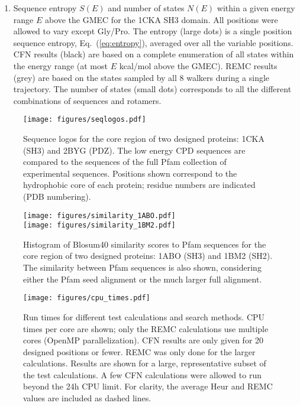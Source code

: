 \documentclass[a4paper,12pt]{article}
\begin{document}
\begin{enumerate}

\item \label{fig:entropy}
Sequence entropy $S(E)$ and number of states $N(E)$ within a given energy range $E$ above the GMEC for the 1CKA
SH3 domain. All positions were allowed to vary except Gly/Pro. The entropy (large dots) is a single position
sequence entropy, Eq.\ (\ref{eq:entropy}), averaged over all the variable positions. CFN results (black) are based
on a complete enumeration of all states within the energy range (at most $E$ kcal/mol above the GMEC). REMC results
(grey) are based on the states sampled by all 8 walkers during a single trajectory. The number of states (small dots)
corresponds to all the different combinations of sequences and rotamers.

\end{enumerate}


\begin{figure}[!h]
\texttt{[image: figures/seqlogos.pdf]}
\caption[width=1cm]{\small 
Sequence logos for the core region of two designed proteins: 1CKA (SH3) and 2BYG (PDZ).
The low energy CPD sequences are compared to the sequences of the full Pfam collection of
experimental sequences. Positions shown correspond to the hydrophobic core of each
protein; residue numbers are indicated (PDB numbering).
}
\end{figure}


\begin{figure}[!h]
\begin{center}
\texttt{[image: figures/similarity\_1ABO.pdf]} \\
\texttt{[image: figures/similarity\_1BM2.pdf]} 
\end{center}
\caption[width=1cm]{\small 
Histogram of Blosum40 similarity scores to Pfam sequences for the core region of two
designed proteins: 1ABO (SH3) and 1BM2 (SH2). The similarity between Pfam sequences is
also shown, considering either the Pfam seed alignment or the much larger full alignment.
}
\end{figure}


\begin{figure}[!h]
\begin{center}
\texttt{[image: figures/cpu\_times.pdf]}
\end{center}
\caption{\small 
Run times for different test calculations and search methods. CPU times per core are
shown; only the REMC calculations use multiple cores (OpenMP parallelization). CFN results
are only given for 20 designed positions or fewer. REMC was only done for the larger
calculations. Results are shown for a large, representative subset of the test calculations.
A few CFN calculations were allowed to run beyond the 24h CPU limit. For clarity, the
average Heur and REMC values are included as dashed lines.
}
\end{figure}
\end{document}
